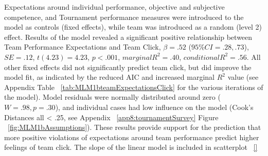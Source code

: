 \begin{CJK}{UTF8}{gbsn}
Expectations around individual performance, objective and subjective competence, and Tournament performance measures were introduced to the model as controls (fixed effects), while team was introduced as a random (level 2) effect.  Results of the model revealed a significant positive relationship between Team Performance Expectations and Team Click, $\beta = .52$ ($95\% CI =  .28, .73$), $SE = .12$, $t(4.23) = 4.23$, $p < .001$, $marginal R^2 = .40$, $conditional R^2 = .56$.  All other fixed effects did not significantly predict team click, but did improve the model fit, as indicated by the reduced AIC and increased marginal $R^2$ value (see Appendix Table ~\ref{tab:MLM1bteamExpectationsClick} for the various iterations of the model).   Model residuals were normally distributed around zero ($W = .98, p = .30$), and individual cases had low influence on the model (Cook's Distances all < .25, see Appendix ~\ref{app8:tournamentSurvey} Figure ~\ref{fig:MLM1bAssumptions}).  These results provide support for the prediction that more positive violations of expectations around team performance predict higher feelings of team click.  The slope of the linear model is included in scatterplot ~\ref{}


  


\end{CJK}

